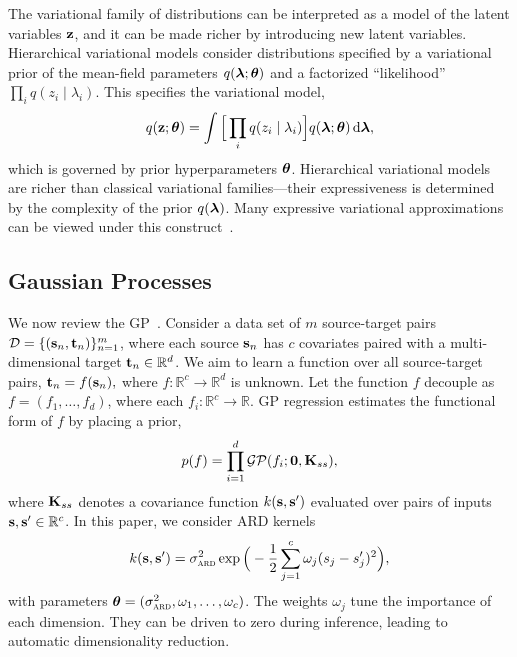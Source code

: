 The variational family of distributions can be interpreted as a model
of the latent variables $\boldsymbol{\mathbf{z}}$, and it can be made richer by
introducing new latent variables. Hierarchical variational models
consider distributions specified by a variational prior of the
mean-field parameters $q(\boldsymbol{\mathbf{\lambda}};\boldsymbol{\mathbf{\theta}})$ and a factorized
``likelihood'' $\prod_i q(z_i\mid\lambda_i)$.  This specifies the
variational model,
\begin{equation}
\label{eq:hvm}
q(\boldsymbol{\mathbf{z}};\boldsymbol{\mathbf{\theta}})=\int
\Big[\prod_i q(z_i\mid\lambda_i)\Big]
q(\boldsymbol{\mathbf{\lambda}};\boldsymbol{\mathbf{\theta}})\operatorname{d}\!{\boldsymbol{\mathbf{\lambda}}},
\end{equation}
which is governed by prior hyperparameters $\boldsymbol{\mathbf{\theta}}$.  Hierarchical
variational models are richer than classical variational
families---their expressiveness is determined by the complexity
of the prior $q(\boldsymbol{\mathbf{\lambda}})$. Many expressive variational
approximations can be viewed under this
construct~\citep{saul1996exploiting,jaakola1998improving,rezende2015variational,tran2015copula}.

\subsection{Gaussian Processes}
\label{sec:background:gaussian}

We now review the
\gls{GP}~\citep{rasmussen2006gaussian}. Consider a data
set of $m$ source-target pairs $\mathcal{D}=\{(\mathbf{s}_n,\mathbf{t}_n)\}_{n=1}^m$,
where each source $\mathbf{s}_n$ has $c$ covariates paired with a
multi-dimensional target $\mathbf{t}_n\in\mathbb{R}^{d}$. We aim to learn a
function over all source-target pairs,
$
\mathbf{t}_n = f(\mathbf{s}_n),
$
where $f:\mathbb{R}^c\to\mathbb{R}^d$ is unknown. Let the function
$f$ decouple as $f=(f_1,\ldots,f_d)$, where each
$f_i:\mathbb{R}^c\to\mathbb{R}$. \gls{GP} regression estimates the
functional form of $f$ by placing a prior,
\begin{equation*}
p(f) = \prod_{i=1}^d \mathcal{GP}(f_i; \boldsymbol{\mathbf{0}}, \mathbf{K}_{ss}),
\end{equation*}
where $\mathbf{K}_{ss}$ denotes a covariance function $k(\mathbf{s},\mathbf{s}')$ evaluated over pairs
of inputs $\mathbf{s},\mathbf{s}'\in\mathbb{R}^c$.
In this paper, we consider \gls{ARD} kernels
\begin{equation}
k(\mathbf{s},\mathbf{s}') = \sigma^2_{\textsc{ard}} \exp\Big(
-\frac{1}{2}\sum_{j=1}^c \omega_j(s_j - s'_j)^2
\Big),
\label{eq:ard}
\end{equation}
with parameters
$\boldsymbol{\mathbf{\theta}}=(\sigma^2_{\textsc{ard}},\omega_1,\ldots,\omega_c)$. The
weights $\omega_j$ tune the importance of each dimension.
They can be driven to zero during inference, leading to automatic
dimensionality reduction.

